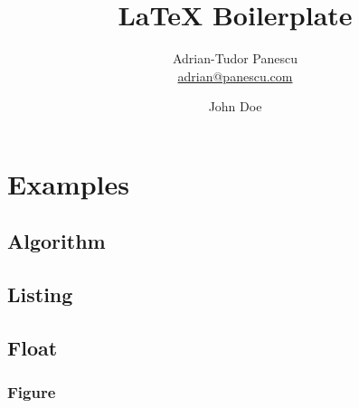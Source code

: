 \documentclass[12pt,a4paper,twoside]{report}
\author{
  Adrian-Tudor Panescu \\
  \href{mailto:adrian@panescu.com}{adrian@panescu.com}
  \and 
  John Doe
}
\title{LaTeX Boilerplate}
\date{}  %
\begin{document}
     
    
    

    \setcounter{page}{3}
    
    \begin{abstract}
        
    \end{abstract}
    
    
      
    \tableofcontents
    
    \cleardoublepage  
    
    \section{Examples}
        \label{sec:ex}
        
        
        \FloatBarrier

        \subsection{Algorithm}
            \label{sec:algo}    
            

        \clearpage

        \subsection{Listing}
            \label{sec:lst}    
            

        \clearpage
            
        \subsection{Float}
            \label{sec:float}    
            
        
            \FloatBarrier
            
            \subsubsection{Figure}
                \label{sec:fig}    
                

            \FloatBarrier
\end{document}
